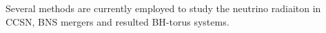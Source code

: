 

Several methods are currently employed to study the neutrino radiaiton in 
\ac{CCSN}, \ac{BNS} mergers and resulted \ac{BH}-torus systems.

